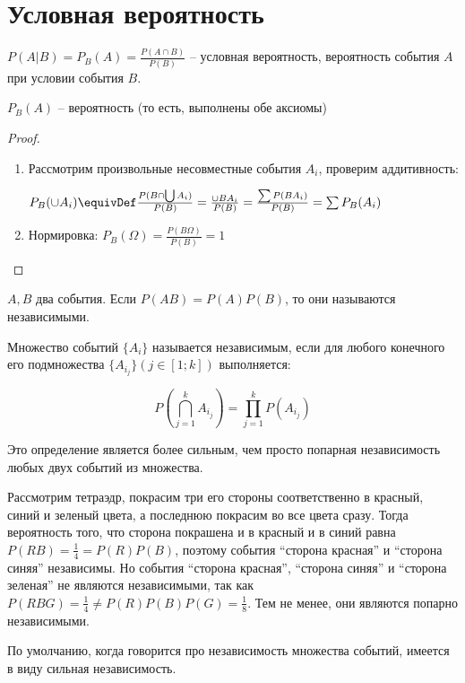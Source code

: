 \section{Условная вероятность}
\begin{Def}
    $P(A | B) = P_B(A) = \frac{P(A \cap B)}{P(B)}$ -- условная вероятность, вероятность события $A$ при условии события $B$.
\end{Def}

\begin{theorem}
    $P_B(A)$ -- вероятность (то есть, выполнены обе аксиомы)
\end{theorem}
\begin{proof}
\begin{enumerate}
\item
    Рассмотрим произвольные несовместные события $A_i$, проверим аддитивность:

    $P_B(\cup A_i) \equivDef \frac{P(B \cap \bigcup A_i)}{P(B)} = \frac{\cup BA_i}{P(B)} = \frac{\sum P(BA_i)}{P(B)} = \sum P_B(A_i)$
\item
    Нормировка: $P_B(\Omega) = \frac{P(B\Omega)}{P(B)} = 1$
\end{enumerate}
\end{proof}

\begin{Def}
    $A, B$ два события. Если $P(AB) = P(A)P(B)$, то они называются независимыми.
\end{Def}
\begin{Def}

    Множество событий $\{A_i\}$ называется независимым, если для любого конечного его подмножества $\{A_{i_j} \} (j \in [1; k])$ выполняется:

    $$P(\bigcap\limits_{j=1}^k A_{i_j}) = \prod\limits_{j=1}^k P(A_{i_j})$$
\end{Def}
\begin{Rem}
Это определение является более сильным, чем просто попарная независимость любых двух событий из множества.
\end{Rem}
\begin{exmp}
Рассмотрим тетраэдр, покрасим три его стороны соответственно в красный, синий и зеленый цвета, а последнюю покрасим во все цвета сразу.
Тогда вероятность того, что сторона покрашена и в красный и в синий равна $P(RB) = \frac14 = P(R)P(B)$, поэтому события ``сторона красная'' и ``сторона синяя'' независимы.
Но события ``сторона красная'', ``сторона синяя'' и ``сторона зеленая'' не являются независимыми, так как $P(RBG) = \frac14 \neq P(R)P(B)P(G) = \frac18$. 
Тем не менее, они являются попарно независимыми.
\end{exmp}
\begin{Rem}
По умолчанию, когда говорится про независимость множества событий, имеется в виду сильная независимость.
\end{Rem}

